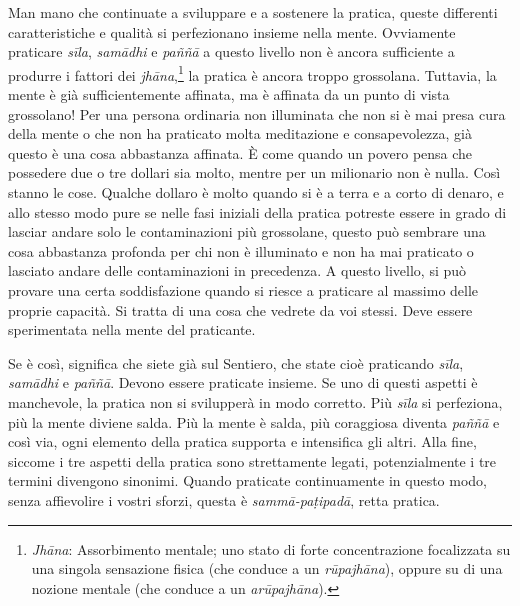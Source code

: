 Man mano che continuate a sviluppare e a sostenere la pratica, queste
differenti caratteristiche e qualità si perfezionano insieme nella
mente. Ovviamente praticare \emph{sīla}, \emph{samādhi} e \emph{paññā} a
questo livello non è ancora sufficiente a produrre i fattori dei
\emph{jhāna},\footnote{\emph{Jhāna}: Assorbimento mentale; uno stato di
  forte concentrazione focalizzata su una singola sensazione fisica (che
  conduce a un \emph{rūpajhāna}), oppure su di una nozione mentale (che
  conduce a un \emph{arūpajhāna}).} la pratica è ancora troppo
grossolana. Tuttavia, la mente è già sufficientemente affinata, ma è
affinata da un punto di vista grossolano! Per una persona ordinaria non
illuminata che non si è mai presa cura della mente o che non ha
praticato molta meditazione e consapevolezza, già questo è una cosa
abbastanza affinata. È come quando un povero pensa che possedere due o
tre dollari sia molto, mentre per un milionario non è nulla. Così stanno
le cose. Qualche dollaro è molto quando si è a terra e a corto di
denaro, e allo stesso modo pure se nelle fasi iniziali della pratica
potreste essere in grado di lasciar andare solo le contaminazioni più
grossolane, questo può sembrare una cosa abbastanza profonda per chi non
è illuminato e non ha mai praticato o lasciato andare delle
contaminazioni in precedenza. A questo livello, si può provare una certa
soddisfazione quando si riesce a praticare al massimo delle proprie
capacità. Si tratta di una cosa che vedrete da voi stessi. Deve essere
sperimentata nella mente del praticante.

Se è così, significa che siete già sul Sentiero, che state cioè
praticando \emph{sīla}, \emph{samādhi} e \emph{paññā}. Devono essere
praticate insieme. Se uno di questi aspetti è manchevole, la pratica non
si svilupperà in modo corretto. Più \emph{sīla} si perfeziona, più la
mente diviene salda. Più la mente è salda, più coraggiosa diventa
\emph{paññā} e così via, ogni elemento della pratica supporta e
intensifica gli altri. Alla fine, siccome i tre aspetti della pratica
sono strettamente legati, potenzialmente i tre termini divengono
sinonimi. Quando praticate continuamente in questo modo, senza
affievolire i vostri sforzi, questa è \emph{sammā-paṭipadā}, retta
pratica.

